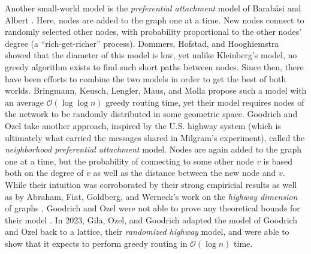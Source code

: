 Another small-world model is the \emph{preferential attachment} model of Barabási and Albert \cite{barabasipreferential}. 
Here, nodes are added to the graph one at a time.
New nodes connect to randomly selected other nodes, with probability proportional to the other nodes' degree (a ``rich-get-richer'' process). Dommers, Hofstad, and Hooghiemstra \cite{dommers2010diameters} showed that the diameter of this model is low, yet unlike Kleinberg's model, no greedy algorithm exists to find such short paths between nodes. 
Since then, there have been efforts to combine the two models in order to get the best of both worlds.
Bringmann, Keusch, Lengler, Maus, and Molla propose such a model with an average $\mathcal{O}(\log\log n)$ greedy routing time, yet their model requires nodes of the network to be randomly distributed in some geometric space. 
Goodrich and Ozel take another approach, inspired by the U.S. highway system (which is ultimately what carried the messages shared in Milgram's experiment), called the \emph{neighborhood preferential attachment} model. 
Nodes are again added to the graph one at a time, but the probability of connecting to some other node $v$ is based both on the degree of $v$ as well as the distance between the new node and $v$. 
While their intuition was corroborated by their strong empiricial results as well as by Abraham, Fiat, Goldberg, and Werneck's work on the \emph{highway dimension} of graphs \cite{abrahamhighway}, Goodrich and Ozel were not able to prove any theoretical bounds for their model \cite{goodrich2022modeling}. 
In 2023, Gila, Ozel, and Goodrich \cite{gila2023highway} adapted the model of Goodrich and Ozel back to a lattice, their \emph{randomized highway} model, and were able to show that it expects to perform greedy routing in $\mathcal{O}(\log n)$ time. 